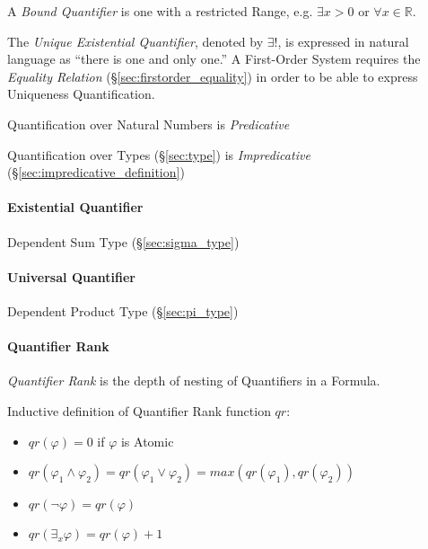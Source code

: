 A \emph{Bound Quantifier} is one with a restricted Range, e.g.
$\exists x > 0$ or $\forall x \in \mathbb{R}$.

The \emph{Unique Existential Quantifier}, denoted by $\exists !$, is
expressed in natural language as ``there is one and only one.'' A
First-Order System requires the \emph{Equality Relation}
(\S\ref{sec:firstorder_equality}) in order to be able to express
Uniqueness Quantification.

Quantification over Natural Numbers is \emph{Predicative}

Quantification over Types (\S\ref{sec:type}) is \emph{Impredicative}
(\S\ref{sec:impredicative_definition})



\paragraph{Existential Quantifier}\label{sec:existential_quantifier}\hfill

Dependent Sum Type (\S\ref{sec:sigma_type})



\paragraph{Universal Quantifier}\label{sec:universal_quantifier}\hfill

Dependent Product Type (\S\ref{sec:pi_type})



\paragraph{Quantifier Rank}\label{sec:quantifier_rank}\hfill

\emph{Quantifier Rank} is the depth of nesting of Quantifiers in a
Formula.

Inductive definition of Quantifier Rank function $qr$:
\begin{itemize}
  \item $qr(\varphi) = 0$ if $\varphi$ is Atomic
  \item $qr(\varphi_1 \wedge \varphi_2) =
    qr(\varphi_1 \vee \varphi_2) = max(qr(\varphi_1),qr(\varphi_2))$
  \item $qr(\neg \varphi) = qr(\varphi)$
  \item $qr(\exists_x \varphi) = qr(\varphi) + 1$
\end{itemize}



